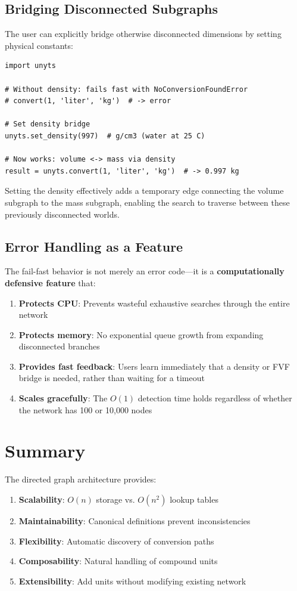 \documentclass[11pt,a4paper]{report}
\begin{document}
\subsection{Bridging Disconnected Subgraphs}

The user can explicitly bridge otherwise disconnected dimensions by setting physical constants:

\begin{lstlisting}[style=pythonstyle, caption={Bridging mass and volume with density}]
import unyts

# Without density: fails fast with NoConversionFoundError
# convert(1, 'liter', 'kg')  # -> error

# Set density bridge
unyts.set_density(997)  # g/cm3 (water at 25 C)

# Now works: volume <-> mass via density
result = unyts.convert(1, 'liter', 'kg')  # -> 0.997 kg
\end{lstlisting}

Setting the density effectively adds a temporary edge connecting the volume subgraph to the mass subgraph, enabling the search to traverse between these previously disconnected worlds.

\subsection{Error Handling as a Feature}

The fail-fast behavior is not merely an error code---it is a \textbf{computationally defensive feature} that:
\begin{enumerate}[leftmargin=*]
  \item \textbf{Protects CPU}: Prevents wasteful exhaustive searches through the entire network
  \item \textbf{Protects memory}: No exponential queue growth from expanding disconnected branches
  \item \textbf{Provides fast feedback}: Users learn immediately that a density or FVF bridge is needed, rather than waiting for a timeout
  \item \textbf{Scales gracefully}: The $O(1)$ detection time holds regardless of whether the network has 100 or 10,000 nodes
\end{enumerate}

\section{Summary}

The directed graph architecture provides:
\begin{enumerate}[leftmargin=*]
  \item \textbf{Scalability}: $O(n)$ storage vs. $O(n^2)$ lookup tables
  \item \textbf{Maintainability}: Canonical definitions prevent inconsistencies
  \item \textbf{Flexibility}: Automatic discovery of conversion paths
  \item \textbf{Composability}: Natural handling of compound units
  \item \textbf{Extensibility}: Add units without modifying existing network
\end{enumerate}
\end{document}
